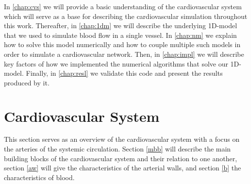 \documentclass[a4paper, oneside]{discothesis}
\begin{document}
In \autoref{chap:cvs} we will provide a basic understanding of the cardiovascular system which will serve as a base for describing the cardiovascular simulation throughout this work.
Thereafter, in \autoref{chap:1dm} we will describe the underlying 1D-model that we used to simulate blood flow in a single vessel.
In \autoref{chap:nm} we explain how to solve this model numerically and how to couple multiple such models in order to simulate a cardiovascular network.
Then, in \autoref{chap:impl}  we will describe key factors of how we implemented the numerical algorithms that solve our 1D-model.
Finally, in \autoref{chap:resl} we validate this code and present the results produced by it.











\chapter{Cardiovascular System} \label{chap:cvs}
This section serves as an overview of the cardiovascular system with a focus on the arteries of the systemic circulation. 
Section \ref{mbb} will describe the main building blocks of the cardiovascular system and their relation to one another, section \ref{aw} will give the characteristics of the arterial walls, and section \ref{b} the characteristics of blood.
\end{document}

